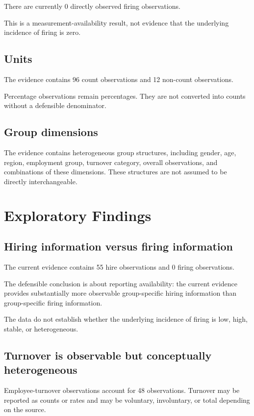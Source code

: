 \documentclass[a4paper,10pt]{article}
\begin{document}
There are currently 0 directly observed firing observations.

This is a measurement-availability result, not evidence that the underlying incidence of firing is zero.

\subsection{Units}

The evidence contains 96 count observations and 12 non-count observations.

Percentage observations remain percentages. They are not converted into counts without a defensible denominator.

\subsection{Group dimensions}

The evidence contains heterogeneous group structures, including gender, age, region, employment group, turnover category, overall observations, and combinations of these dimensions. These structures are not assumed to be directly interchangeable.

\section{Exploratory Findings}

\subsection{Hiring information versus firing information}

The current evidence contains 55 hire observations and 0 firing observations.

The defensible conclusion is about reporting availability: the current evidence provides substantially more observable group-specific hiring information than group-specific firing information.

The data do not establish whether the underlying incidence of firing is low, high, stable, or heterogeneous.

\subsection{Turnover is observable but conceptually heterogeneous}

Employee-turnover observations account for 48 observations. Turnover may be reported as counts or rates and may be voluntary, involuntary, or total depending on the source.
\end{document}
